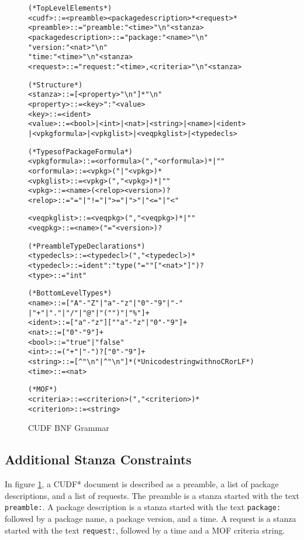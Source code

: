 \begin{figure}[htp] 
\begin{center}
\begin{alltt}
(* Top Level Elements *)
<cudf> ::= <preamble> <packagedescription>* <request>*
<preamble> ::= "preamble:" <time> "\textbackslash{}n" <stanza>
<packagedescription> ::= "package:" <name> "\textbackslash{}n" \\    "version:" <nat> "\textbackslash{}n" \\    "time:" <time> "\textbackslash{}n" <stanza>
<request> ::= "request:" <time>, <criteria> "\textbackslash{}n" <stanza>

(* Structure *)
<stanza> ::= [<property> "\textbackslash{}n"]* "\textbackslash{}n"
<property> ::= <key> ":" <value>
<key> ::= <ident>
<value> ::= <bool> | <int> | <nat> | <string> | <name> | <ident> \\    | <vpkgformula> | <vpkglist> | <veqpkglist> | <typedecls>

(* Types of Package Formula *)
<vpkgformula> ::= <orformula> ("," <orformula>)* | ""
<orformula> ::= <vpkg> ("|" <vpkg>)*
<vpkglist> ::= <vpkg> ("," <vpkg>)* | ""
<vpkg> ::= <name> (<relop> <version>)?
<relop> ::= "=" | "!=" | ">=" | ">" | "<=" | "<"

<veqpkglist> ::= <veqpkg> ("," <veqpkg>)* | ""
<veqpkg> ::= <name> ("=" <version>)?

(* Preamble Type Declarations *)
<typedecls> ::= <typedecl> ("," <typedecl>)*
<typedecl> ::= ident ":" type ("=" "["<nat>"]")?
<type> ::= "int"

(* Bottom Level Types *)
<name> ::= ["A"-"Z" | "a"-"z" | "0"-"9" | "-" \\    | "+" | "." | "/" | "@" | "(" ")" | "\%"]+
<ident> ::= ["a"-"z"][""a"-"z" | "0"-"9"]+		
<nat> ::= ["0"-"9"]+
<bool> ::= "true" | "false"
<int> ::= ("+"|"-")? ["0"-"9"]+
<string> ::= [^"\textbackslash{}n"| ^"\textbackslash{}n"]* (*Unicode string with no CR or LF*)
<time> ::= <nat>

(* MOF *)
<criteria> ::= <criterion> ("," <criterion>)*
<criterion> ::= <string>
\end{alltt}
  \caption{CUDF BNF Grammar}
  \label{formal.cudfBNFgrammar}
\end{center}
\end{figure}

\subsection{Additional Stanza Constraints}
In figure \ref{formal.cudfBNFgrammar}, a CUDF* document is described as a preamble, a list of package descriptions, and a list of requests.
The preamble is a stanza started with the text \verb+preamble:+.
A package description is a stanza started with the text \verb+package:+ followed by a package name, a package version, and a time.
A request is a stanza started with the text \verb+request:+, followed by a time and a MOF criteria string.

